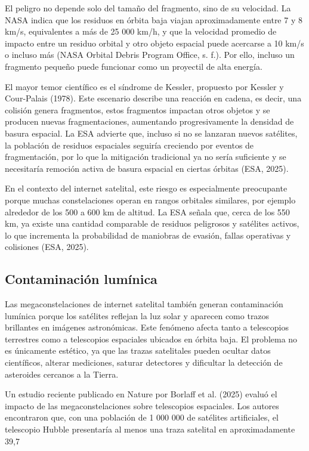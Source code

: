 El peligro no depende solo del tamaño del fragmento, sino de su velocidad. La NASA indica que los residuos en órbita baja viajan aproximadamente entre 7 y 8 km/s, equivalentes a más de 25 000 km/h, y que la velocidad promedio de impacto entre un residuo orbital y otro objeto espacial puede acercarse a 10 km/s o incluso más (NASA Orbital Debris Program Office, s. f.). Por ello, incluso un fragmento pequeño puede funcionar como un proyectil de alta energía.

El mayor temor científico es el síndrome de Kessler, propuesto por Kessler y Cour-Palais (1978). Este escenario describe una reacción en cadena, es decir, una colisión genera fragmentos, estos fragmentos impactan otros objetos y se producen nuevas fragmentaciones, aumentando progresivamente la densidad de basura espacial. La ESA advierte que, incluso si no se lanzaran nuevos satélites, la población de residuos espaciales seguiría creciendo por eventos de fragmentación, por lo que la mitigación tradicional ya no sería suficiente y se necesitaría remoción activa de basura espacial en ciertas órbitas (ESA, 2025).

En el contexto del internet satelital, este riesgo es especialmente preocupante porque muchas constelaciones operan en rangos orbitales similares, por ejemplo alrededor de los 500 a 600 km de altitud. La ESA señala que, cerca de los 550 km, ya existe una cantidad comparable de residuos peligrosos y satélites activos, lo que incrementa la probabilidad de maniobras de evasión, fallas operativas y colisiones (ESA, 2025).

\subsection{Contaminación lumínica}

Las megaconstelaciones de internet satelital también generan contaminación lumínica porque los satélites reflejan la luz solar y aparecen como trazos brillantes en imágenes astronómicas. Este fenómeno afecta tanto a telescopios terrestres como a telescopios espaciales ubicados en órbita baja. El problema no es únicamente estético, ya que las trazas satelitales pueden ocultar datos científicos, alterar mediciones, saturar detectores y dificultar la detección de asteroides cercanos a la Tierra.

Un estudio reciente publicado en Nature por Borlaff et al. (2025) evaluó el impacto de las megaconstelaciones sobre telescopios espaciales. Los autores encontraron que, con una población de 1 000 000 de satélites artificiales, el telescopio Hubble presentaría al menos una traza satelital en aproximadamente 39,7 %

